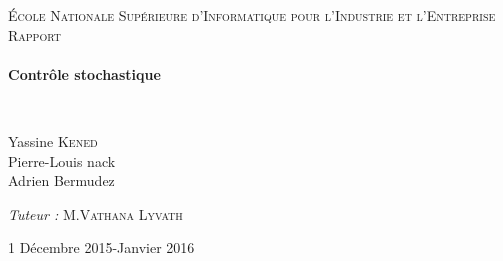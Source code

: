 \begin{titlepage}
  \begin{sffamily}
  \begin{center}


    \textsc{\LARGE École Nationale Supérieure d'Informatique pour l'Industrie et l'Entreprise}\\[3cm]

    \textsc{\Large Rapport }\\[5cm]

    \HRule \\[0.4cm]
    { \huge \bfseries Contrôle stochastique\\[0.4cm] }

    \HRule \\[6cm]
    

    \begin{minipage}{0.4\textwidth}
      \begin{flushleft} \large
      
        Yassine \textsc{Kened}\\
        Pierre-Louis nack\\
        Adrien Bermudez \\
        
      \end{flushleft}
    \end{minipage}
    \begin{minipage}{0.4\textwidth}
      \begin{flushright} \large
        \emph{Tuteur :} M.\textsc{Vathana Lyvath}\\
      \end{flushright}
    \end{minipage}

    \vfill

    {\large 1\ier{} Décembre 2015-Janvier 2016}

  \end{center}
  \end{sffamily}
\end{titlepage}
